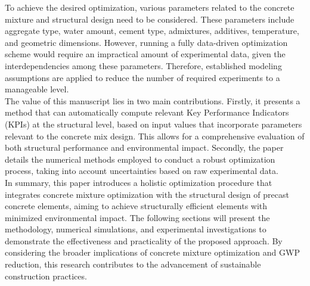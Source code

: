 To achieve the desired optimization, various parameters related to the concrete mixture and structural design need to be considered. 
These parameters include aggregate type, water amount, cement type, admixtures, additives, temperature, and geometric dimensions. 
However, running a fully data-driven optimization scheme would require an impractical amount of experimental data, given the interdependencies among these parameters. 
Therefore, established modeling assumptions are applied to reduce the number of required experiments to a manageable level.\\

The value of this manuscript lies in two main contributions. 
Firstly, it presents a method that can automatically compute relevant Key Performance Indicators (KPIs) at the structural level, based on input values that incorporate parameters relevant to the concrete mix design. 
This allows for a comprehensive evaluation of both structural performance and environmental impact. 
Secondly, the paper details the numerical methods employed to conduct a robust optimization process, taking into account uncertainties based on raw experimental data.\\

In summary, this paper introduces a holistic optimization procedure that integrates concrete mixture optimization with the structural design of precast concrete elements, aiming to achieve structurally efficient elements with minimized environmental impact. 
The following sections will present the methodology, numerical simulations, and experimental investigations to demonstrate the effectiveness and practicality of the proposed approach. 
By considering the broader implications of concrete mixture optimization and GWP reduction, this research contributes to the advancement of sustainable construction practices.



























